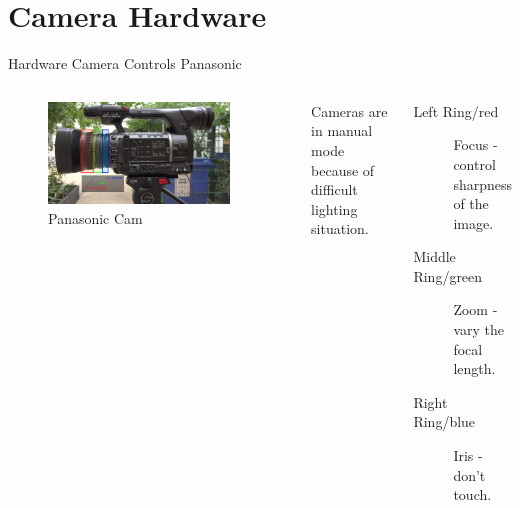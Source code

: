 \documentclass[aspectratio=169]{beamer}
\begin{document}
\section{Camera Hardware}
\begin{frame}{Hardware Camera Controls Panasonic}
	\begin{columns}[T,onlytextwidth]
	\begin{figure} 
		\centering
		\includegraphics[width=0.9\textwidth]{images/panasonic_seitenansicht_objektiv.png}
		\caption{Panasonic Cam}
	\end{figure}
		Cameras are in manual mode because of difficult lighting situation.
		\begin{description}
			\item[Left Ring/red] Focus - control sharpness of the image.
			\item[Middle Ring/green] Zoom - vary the focal length.
			\item[Right Ring/blue] Iris - don't touch.
		\end{description}
	\end{columns}
\end{frame}
\end{document}
